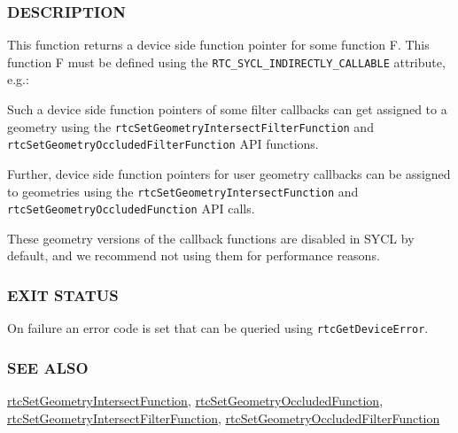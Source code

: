 \subsubsection{DESCRIPTION}\label{description}

This function returns a device side function pointer for some function
F. This function F must be defined using the
\texttt{RTC\_SYCL\_INDIRECTLY\_CALLABLE} attribute, e.g.:

\begin{Shaded}
\begin{Highlighting}[]
\OperatorTok{(}
  \OperatorTok{*}\OperatorTok{)} \OperatorTok{\{}  \OperatorTok{\}}

\OperatorTok{=}\OperatorTok{\textless{}}\OperatorTok{\textgreater{}(}\OperatorTok{);}
\end{Highlighting}
\end{Shaded}

Such a device side function pointers of some filter callbacks can get
assigned to a geometry using the
\texttt{rtcSetGeometryIntersectFilterFunction} and
\texttt{rtcSetGeometryOccludedFilterFunction} API functions.

Further, device side function pointers for user geometry callbacks can
be assigned to geometries using the
\texttt{rtcSetGeometryIntersectFunction} and
\texttt{rtcSetGeometryOccludedFunction} API calls.

These geometry versions of the callback functions are disabled in SYCL
by default, and we recommend not using them for performance reasons.

\subsubsection{EXIT STATUS}\label{exit-status}

On failure an error code is set that can be queried using
\texttt{rtcGetDeviceError}.

\subsubsection{SEE ALSO}\label{see-also}

\hyperref[rtcsetgeometryintersectfunction]{rtcSetGeometryIntersectFunction},
\hyperref[rtcsetgeometryoccludedfunction]{rtcSetGeometryOccludedFunction},
\hyperref[rtcsetgeometryintersectfilterfunction]{rtcSetGeometryIntersectFilterFunction},
\hyperref[rtcsetgeometryoccludedfilterfunction]{rtcSetGeometryOccludedFilterFunction}

